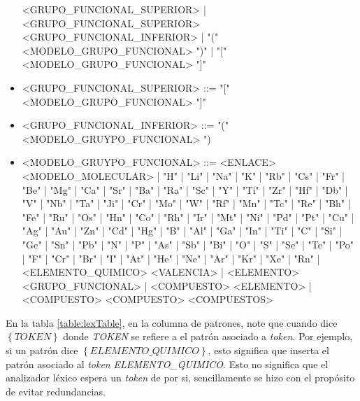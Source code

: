 \begin{itemize}
          <GRUPO\_FUNCIONAL\_SUPERIOR> | <GRUPO\_FUNCIONAL\_SUPERIOR> <GRUPO\_FUNCIONAL\_INFERIOR> | "(" <MODELO\_GRUPO\_FUNCIONAL> ")" | "["  <MODELO\_GRUPO\_FUNCIONAL> "]"
    \item <GRUPO\_FUNCIONAL\_SUPERIOR> ::= "[" <MODELO\_GRUPO\_FUNCIONAL> "]"
    \item <GRUPO\_FUNCIONAL\_INFERIOR> ::= "(" <MODELO\_GRUYPO\_FUNCIONAL> ")
    \item  <MODELO\_GRUYPO\_FUNCIONAL> ::= <ENLACE> <MODELO\_MOLECULAR> | "H" | "Li" | "Na" | "K" | "Rb" | "Cs" | "Fr" | "Be" | "Mg" | "Ca" | "Sr" | "Ba" | "Ra" | "Sc" | "Y" | "Ti" | "Zr" | "Hf" | "Db" | "V" | "Nb" | "Ta" | "Ji" | "Cr" | "Mo" | "W" | "Rf" | "Mn" | "Tc" | "Re" | "Bh" | "Fe" | "Ru" | "Os" | "Hn" | "Co" | "Rh" | "Ir" | "Mt" | "Ni" | "Pd" | "Pt" | "Cu" | "Ag" | "Au" | "Zn" | "Cd" | "Hg" | "B" | "Al" | "Ga" | "In" | "Ti" | "C" | "Si" | "Ge" | "Sn" | "Pb" | "N" | "P" | "As" | "Sb" | "Bi" | "O" | "S" | "Se" | "Te" | "Po" | "F" | "Cr" | "Br" | "I" | "At" | "He" | "Ne" | "Ar" | "Kr" | "Xe" | "Rn" | <ELEMENTO\_QUIMICO> <VALENCIA> | <ELEMENTO> <GRUPO\_FUNCIONAL> | <COMPUESTO> <ELEMENTO> | <COMPUESTO> <COMPUESTO> <COMPUESTOS>
\end{itemize}
\vspace{1cm}
En la tabla \ref{table:lexTable}, en la columna de patrones, note que cuando dice $\left\{\textit{TOKEN}\right\}$ donde \textit{TOKEN} se refiere a el patrón asociado a \textit{token}.
Por ejemplo, si un patrón dice $\left\{\textit{ELEMENTO\_QUIMICO}\right\}$, esto significa que inserta el patrón asociado al \textit{token} \textit{ELEMENTO\_QUIMICO}.
Esto no significa que el analizador léxico espera un \textit{token} de por si, sencillamente se hizo con el propósito de evitar redundancias.
\newpage

